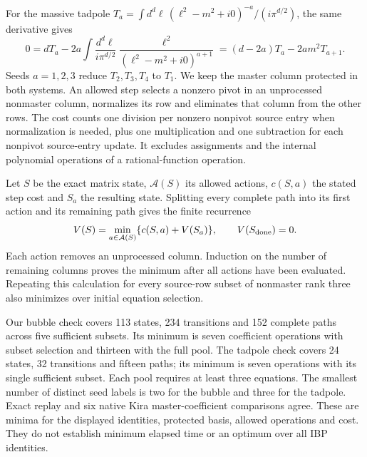 For the massive tadpole $T_a=\int d^d\ell\,(\ell^2-m^2+i0)^{-a}/(i\pi^{d/2})$, the same derivative gives
\begin{equation}
 0=dT_a-2a\int\frac{d^d\ell}{i\pi^{d/2}}
 \frac{\ell^2}{(\ell^2-m^2+i0)^{a+1}}
 =(d-2a)T_a-2am^2T_{a+1}.
\end{equation}
Seeds $a=1,2,3$ reduce $T_2,T_3,T_4$ to $T_1$. We keep the master column protected in both systems. An allowed step selects a nonzero pivot in an unprocessed nonmaster column, normalizes its row and eliminates that column from the other rows. The cost counts one division per nonzero nonpivot source entry when normalization is needed, plus one multiplication and one subtraction for each nonpivot source-entry update. It excludes assignments and the internal polynomial operations of a rational-function operation.

Let $S$ be the exact matrix state, $\mathcal A(S)$ its allowed actions, $c(S,a)$ the stated step cost and $S_a$ the resulting state. Splitting every complete path into its first action and its remaining path gives the finite recurrence~\cite{Bellman1952}
\begin{equation}
 V(S)=\min_{a\in\mathcal A(S)}\{c(S,a)+V(S_a)\},
 \qquad V(S_{\rm done})=0.
\end{equation}
Each action removes an unprocessed column. Induction on the number of remaining columns proves the minimum after all actions have been evaluated. Repeating this calculation for every source-row subset of nonmaster rank three also minimizes over initial equation selection.

Our bubble check covers 113 states, 234 transitions and 152 complete paths across five sufficient subsets. Its minimum is seven coefficient operations with subset selection and thirteen with the full pool. The tadpole check covers 24 states, 32 transitions and fifteen paths; its minimum is seven operations with its single sufficient subset. Each pool requires at least three equations. The smallest number of distinct seed labels is two for the bubble and three for the tadpole. Exact replay and six native Kira master-coefficient comparisons agree. These are minima for the displayed identities, protected basis, allowed operations and cost. They do not establish minimum elapsed time or an optimum over all IBP identities.
